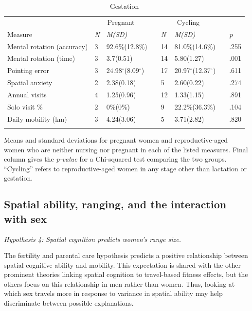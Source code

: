\begin{table}[h!]
\caption{Gestation}
\label{tab:preg}  
\begin{tabular}{llllllll}
\hline\noalign{\smallskip}
& \multicolumn{2}{c}{Pregnant} && \multicolumn{2}{c}{Cycling} && \\
Measure & \emph{N} & \emph{M(SD)} && \emph{N} & \emph{M(SD)} && \emph{p} \\
\noalign{\smallskip}\hline\noalign{\smallskip}
Mental rotation (accuracy) & 3 & 92.6\%(12.8\%) && 14 & 81.0\%(14.6\%) && .255 \\
Mental rotation (time) & 3 & 3.7(0.51) && 14 & 5.80(1.27) && .001 \\
Pointing error & 3 & 24.98$^{\circ}$(8.09$^{\circ}$) && 17 & 20.97$^{\circ}$(12.37$^{\circ}$) && .611 \\
Spatial anxiety & 2 & 2.38(0.18) && 5 & 2.60(0.22) && .274 \\
Annual visits & 4 & 1.25(0.96) && 12 & 1.33(1.15) && .891 \\
Solo visit \% & 2 & 0\%(0\%) && 9 & 22.2\%(36.3\%) && .104 \\
Daily mobility (km) & 3 & 4.24(3.06) && 5 & 3.71(2.82) && .820 \\
\noalign{\smallskip}\hline
\end{tabular}\par
\bigskip
Means and standard deviations for pregnant women and reproductive-aged women who are neither nursing nor pregnant in each of the listed measures. Final column gives the \emph{p-value} for a Chi-squared test comparing the two groups.  ``Cycling'' refers to reproductive-aged women in any stage other than lactation or gestation. 
\end{table}	

	\subsection{Spatial ability, ranging, and the interaction with sex}
	\label{sec:3.4}
	
\emph{Hypothesis 4:  Spatial cognition predicts women's range size.}
	\smallskip

The fertility and parental care hypothesis predicts a positive relationship between spatial-cognitive ability and mobility. This expectation is shared with the other prominent theories linking spatial cognition to travel-based fitness effects, but the others focus on this relationship in men rather than women.  Thus, looking at which sex travels more in response to variance in spatial ability may help discriminate between possible explanations.	


